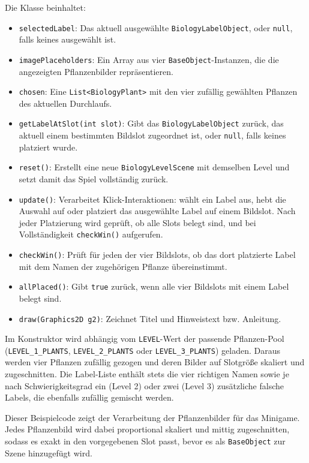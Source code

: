 Die Klasse beinhaltet:
\begin{sloppypar}
    \begin{itemize}
        \item \texttt{selectedLabel}: Das aktuell ausgewählte \texttt{BiologyLabelObject}, oder \texttt{null}, falls keines ausgewählt ist.
        \item \texttt{imagePlaceholders}: Ein Array aus vier \texttt{BaseObject}-Instanzen, die die angezeigten Pflanzenbilder repräsentieren.
        \item \texttt{chosen}: Eine \texttt{List<BiologyPlant>} mit den vier zufällig gewählten Pflanzen des aktuellen Durchlaufs.
        \item \texttt{getLabelAtSlot(int slot)}: Gibt das \texttt{BiologyLabelObject} zurück, das aktuell einem bestimmten Bildslot zugeordnet ist, oder \texttt{null}, falls keines platziert wurde.
        \item \texttt{reset()}: Erstellt eine neue \texttt{BiologyLevelScene} mit demselben Level und setzt damit das Spiel vollständig zurück.
        \item \texttt{update()}: Verarbeitet Klick-Interaktionen: wählt ein Label aus, hebt die Auswahl auf oder platziert das ausgewählte Label auf einem Bildslot. Nach jeder Platzierung wird geprüft, ob alle Slots belegt sind, und bei Vollständigkeit \texttt{checkWin()} aufgerufen.
        \item \texttt{checkWin()}: Prüft für jeden der vier Bildslots, ob das dort platzierte Label mit dem Namen der zugehörigen Pflanze übereinstimmt.
        \item \texttt{allPlaced()}: Gibt \texttt{true} zurück, wenn alle vier Bildslots mit einem Label belegt sind.
        \item \texttt{draw(Graphics2D g2)}: Zeichnet Titel und Hinweistext bzw. Anleitung.
    \end{itemize}
\end{sloppypar}

Im Konstruktor wird abhängig vom \texttt{LEVEL}-Wert der passende Pflanzen-Pool (\texttt{LEVEL\_1\_PLANTS}, \texttt{LEVEL\_2\_PLANTS} oder \texttt{LEVEL\_3\_PLANTS}) geladen. Daraus werden vier Pflanzen zufällig gezogen und deren Bilder auf Slotgröße skaliert und zugeschnitten.
Die Label-Liste enthält stets die vier richtigen Namen sowie je nach Schwierigkeitsgrad ein (Level 2) oder zwei (Level 3) zusätzliche falsche Labels, die ebenfalls zufällig gemischt werden.

Dieser Beispielcode zeigt der Verarbeitung der Pflanzenbilder für das Minigame.
Jedes Pflanzenbild wird dabei proportional skaliert und mittig zugeschnitten, sodass es exakt in den vorgegebenen Slot passt, bevor es als \texttt{BaseObject} zur Szene hinzugefügt wird.

